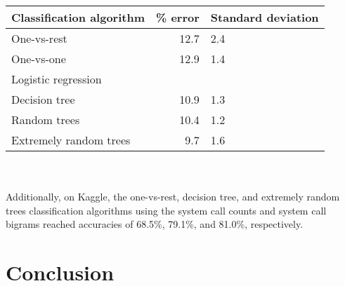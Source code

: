 \documentclass[11pt]{amsart}
\begin{document}
\begin{tabular}{l | r | l}
Classification algorithm & \% error & Standard deviation \\
\hline
One-vs-rest & 12.7 & 2.4 \\
One-vs-one & 12.9 & 1.4 \\
Logistic regression & & \\
Decision tree & 10.9 & 1.3 \\
Random trees & 10.4 & 1.2 \\
Extremely random trees & 9.7 & 1.6 \\
\end{tabular}
\\
\\
Additionally, on Kaggle, the one-vs-rest, decision tree, and extremely random trees classification algorithms using the system call counts and system call bigrams reached accuracies of 68.5\%, 79.1\%, and 81.0\%, respectively.

\section{Conclusion}


\begingroup
\begin{thebibliography}{9}


\end{thebibliography}
\endgroup
\end{document}
